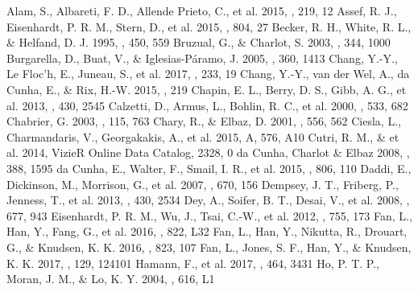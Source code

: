 \documentclass[twocolumn]{aastex6}
\begin{document}
\begin{thebibliography}{}
Alam, S., Albareti, F. D., Allende Prieto, C., et al. 2015, \apjs, 219, 12
Assef, R. J., Eisenhardt, P. R. M., Stern, D., et al. 2015, \apj, 804, 27
Becker, R. H., White, R. L., \& Helfand, D. J. 1995, \apj, 450, 559
Bruzual, G., \& Charlot, S. 2003, \mnras, 344, 1000
Burgarella, D., Buat, V., \& Iglesias-P\'aramo, J. 2005, \mnras, 360, 1413
Chang, Y.-Y., Le Floc'h, E., Juneau, S., et al. 2017, \apjs, 233, 19
Chang, Y.-Y., van der Wel, A., da Cunha, E., \& Rix, H.-W. 2015, \apjs, 219
Chapin, E. L., Berry, D. S., Gibb, A. G., et al. 2013, \mnras, 430, 2545
Calzetti, D., Armus, L., Bohlin, R. C., et al. 2000, \apj, 533, 682
Chabrier, G. 2003, \pasp, 115, 763
Chary, R., \& Elbaz, D. 2001, \apj, 556, 562
Ciesla, L., Charmandaris, V., Georgakakis, A., et al. 2015, A\aap, 576, A10
Cutri, R. M., \& et al. 2014, VizieR Online Data Catalog, 2328, 0
da Cunha, Charlot \& Elbaz 2008, \mnras, 388, 1595
da Cunha, E., Walter, F., Smail, I. R., et al. 2015, \apj, 806, 110
Daddi, E., Dickinson, M., Morrison, G., et al. 2007, \apj, 670, 156
Dempsey, J. T., Friberg, P., Jenness, T., et al. 2013, \mnras, 430, 2534
Dey, A., Soifer, B. T., Desai, V., et al. 2008, \apj, 677, 943
Eisenhardt, P. R. M., Wu, J., Tsai, C.-W., et al. 2012, \apj, 755, 173
Fan, L., Han, Y., Fang, G., et al. 2016, \apjl, 822, L32
Fan, L., Han, Y., Nikutta, R., Drouart, G., \& Knudsen, K. K. 2016, \apj, 823, 107
Fan, L., Jones, S. F., Han, Y., \& Knudsen, K. K. 2017, \pasp, 129, 124101
Hamann, F., et al. 2017, \mnras, 464, 3431
Ho, P. T. P., Moran, J. M., \& Lo, K. Y. 2004, \apjl, 616, L1

\end{thebibliography}
\end{document}
